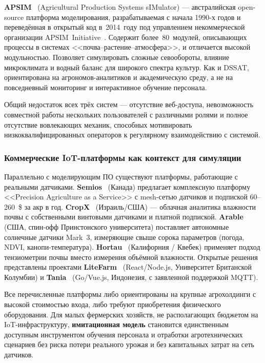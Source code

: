 \textbf{APSIM}~\cite{apsim_info} (Agricultural Production Systems
sIMulator) --- австралийская open-source платформа моделирования,
разрабатываемая с начала 1990-х годов и переведённая в открытый код
в~2014~году под управлением некоммерческой организации
APSIM~Initiative~\cite{holzworth2014_apsim}. Содержит более~80~модулей,
описывающих процессы в системах <<почва--растение--атмосфера>>, и
отличается высокой модульностью. Позволяет симулировать сложные
севообороты, влияние микроклимата и водный баланс для широкого спектра
культур. Как и DSSAT, ориентирована на агрономов-аналитиков и
академическую среду, а не на повседневный мониторинг и интерактивное
обучение персонала.

Общий недостаток всех трёх систем --- отсутствие веб-доступа,
невозможность совместной работы нескольких пользователей с различными
ролями и полное отсутствие вовлекающих механик, способных мотивировать
низкоквалифицированных операторов к регулярному взаимодействию
с системой.

\subsubsection{Коммерческие IoT-платформы как контекст для симуляции}

Параллельно с моделирующим ПО существуют платформы, работающие с
реальными датчиками. \textbf{Semios}~\cite{semios_official,semios_aginvesting}
(Канада) предлагает комплексную платформу <<Precision Agriculture
as a Service>> с mesh-сетью датчиков и подпиской 60--260~\$ за акр в
год. \textbf{CropX}~\cite{cropx_official,cropx_thespoon} (Израиль/США) ---
облачная аналитика влажности почвы с собственными винтовыми датчиками
и платной подпиской. \textbf{Arable}~\cite{arable_mark3_official,arable_futurefarming}
(США, спин-офф Принстонского университета) поставляет автономные
солнечные датчики Mark~3, измеряющие свыше сорока параметров (погода,
NDVI, канопи-температура). \textbf{Hortau}~\cite{hortau_official,hortau_growingproduce}
(Калифорния / Квебек) применяет подход тензиометрии почвы вместо
измерения объёмной влажности. Открытые решения представлены проектами
\textbf{LiteFarm}~\cite{litefarm_official,litefarm_github}
(React/Node.js, Университет Британской Колумбии) и
\textbf{Tania}~\cite{tania_github,tania_usetania_site} (Go/Vue.js,
Индонезия, с заявленной поддержкой MQTT).

Все перечисленные платформы либо ориентированы на крупные
агрохолдинги с высокой стоимостью входа, либо требуют приобретения
физического оборудования. Для малых фермерских хозяйств, не
располагающих бюджетом на IoT-инфраструктуру, \textbf{имитационная
модель} становится единственным доступным инструментом обучения
персонала и отработки агротехнических сценариев без риска потери
реального урожая и без капитальных затрат на сеть датчиков.


